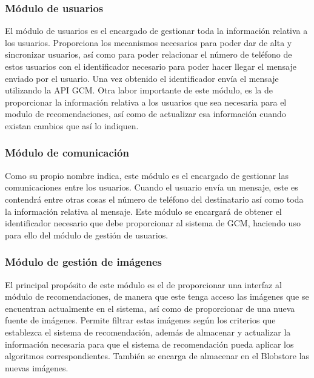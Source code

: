 \subsubsection{Módulo de usuarios}
El módulo de usuarios es el encargado de gestionar toda la información relativa a los usuarios. Proporciona los mecanismos necesarios para poder dar de alta y sincronizar usuarios, así como para poder relacionar el número de teléfono de estos usuarios con el identificador necesario para poder hacer llegar el mensaje enviado por el usuario. Una vez obtenido el identificador envía el mensaje utilizando la \acs{API} \acs{GCM}. Otra labor importante de este módulo, es la de proporcionar la información relativa a los usuarios que sea necesaria para el modulo de recomendaciones, así como de actualizar esa información cuando existan cambios que así lo indiquen. 

\subsubsection{Módulo de comunicación}
Como su propio nombre indica, este módulo es el encargado de gestionar las comunicaciones entre los usuarios. Cuando el usuario envía un mensaje, este es contendrá entre otras cosas el número de teléfono del destinatario así como toda la información relativa al mensaje. Este módulo se encargará de obtener el identificador necesario que debe proporcionar al sistema de \ac{GCM}, haciendo uso para ello del módulo de gestión de usuarios.


\subsubsection{Módulo de gestión de imágenes}
El principal propósito de este módulo es el de proporcionar una interfaz al módulo de recomendaciones, de manera que este tenga acceso las imágenes que se encuentran actualmente en el sistema, así como de proporcionar de una nueva fuente de imágenes. Permite filtrar estas imágenes según los criterios que establezca el sistema de recomendación, además de almacenar y actualizar la información necesaria para que el sistema de recomendación pueda aplicar los algoritmos correspondientes. También se encarga de almacenar en el Blobstore las nuevas imágenes.

